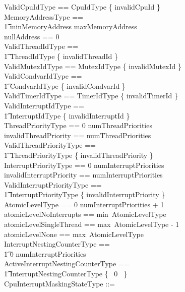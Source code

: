 \documentclass[11pt,letterpaper,twoside,openany]{book}
\begin{document}
\begin{zed}
    ValidCpuIdType == CpuIdType \setminus \{ invalidCpuId \} \\
    MemoryAddressType == \\
    \t1 minMemoryAddress \upto maxMemoryAddress \\
    nullAddress == 0 \\
    ValidThreadIdType == \\
    \t1 ThreadIdType \setminus \{ invalidThreadId \} \\
    ValidMutexIdType == MutexIdType \setminus \{ invalidMutexId \} \\
    ValidCondvarIdType == \\
    \t1 CondvarIdType \setminus \{ invalidCondvarId \} \\
    ValidTimerIdType == TimerIdType \setminus \{ invalidTimerId \} \\
    ValidInterruptIdType == \\
    \t1 InterruptIdType \setminus \{ invalidInterruptId \} \\
    ThreadPriorityType == 0 \upto numThreadPriorities \\
    invalidThreadPriority == numThreadPriorities \\
    ValidThreadPriorityType == \\
    \t1 ThreadPriorityType \setminus \{ invalidThreadPriority \} \\
    InterruptPriorityType == 0 \upto numInterruptPriorities \\
    invalidInterruptPriority == numInterruptPriorities \\
    ValidInterruptPriorityType == \\
    \t1 InterruptPriorityType \setminus \{ invalidInterruptPriority \} \\
    AtomicLevelType == 0 \upto numInterruptPriorities + 1 \\
    atomicLevelNoInterrupts == min~AtomicLevelType \\
    atomicLevelSingleThread == max~AtomicLevelType - 1 \\
    atomicLevelNone == max~AtomicLevelType \\
    InterruptNestingCounterType == \\
    \t1 0 \upto numInterruptPriorities \\
    ActiveInterruptNestingCounterType == \\
    \t1 InterruptNestingCounterType \setminus \{~ 0 ~\} \\
    CpuInterruptMaskingStateType ::= \\

\end{zed}
\end{document}

